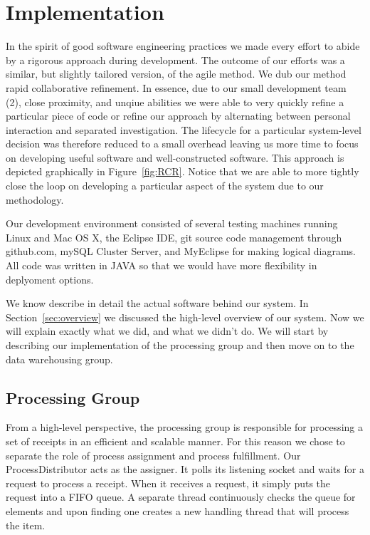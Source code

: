 \section{Implementation}
\label{sec:implementation}

In the spirit of good software engineering practices we made every
effort to abide by a rigorous approach during development. The outcome
of our efforts was a similar, but slightly tailored version, of the
agile method. We dub our method rapid collaborative refinement. In
essence, due to our small development team (2), close proximity, and
unqiue abilities we were able to very quickly refine a particular
piece of code or refine our approach by alternating between personal
interaction and separated investigation. The lifecycle for a
particular system-level decision was therefore reduced to a small
overhead leaving us more time to focus on developing useful software
and well-constructed software. This approach is depicted graphically
in Figure~\ref{fig:RCR}. Notice that we are able to more tightly close
the loop on developing a particular aspect of the system due to our
methodology.



Our development environment consisted of several testing machines
running Linux and Mac OS X, the Eclipse IDE, git source code
management through github.com, mySQL Cluster Server, and MyEclipse for
making logical diagrams. All code was written in JAVA so that we
would have more flexibility in deplyoment options.

We know describe in detail the actual software behind our system. In
Section~\ref{sec:overview} we discussed the high-level overview of our
system. Now we will explain exactly what we did, and what we didn't
do. We will start by describing our implementation of the processing
group and then move on to the data warehousing group.

\subsection{Processing Group}
\label{sec:implementation.processing}

From a high-level perspective, the processing group is responsible for
processing a set of receipts in an efficient and scalable manner. For
this reason we chose to separate the role of process assignment and
process fulfillment. Our ProcessDistributor acts as the assigner. It
polls its listening socket and waits for a request to process a
receipt. When it receives a request, it simply puts the request into a
FIFO queue. A separate thread continuously checks the queue for
elements and upon finding one creates a new handling thread that will
process the item.

